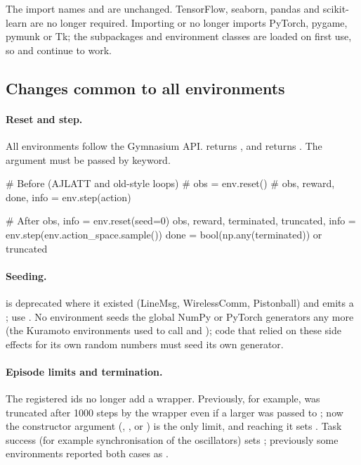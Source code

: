 The import names  and  are unchanged. TensorFlow,
seaborn, pandas and scikit-learn are no longer required. Importing
 or  no longer imports PyTorch, pygame, pymunk or
Tk; the subpackages and environment classes are loaded on first use, so
 and
 continue to work.

\subsection{Changes common to all environments}\label{sec:migration-common}

\paragraph{Reset and step.}
All environments follow the Gymnasium API.  returns , and
 returns . The  argument must be passed by keyword.

\begin{pycode}
# Before (AJLATT and old-style loops)
# obs = env.reset()
# obs, reward, done, info = env.step(action)

# After
obs, info = env.reset(seed=0)
obs, reward, terminated, truncated, info = env.step(env.action_space.sample())
done = bool(np.any(terminated)) or truncated
\end{pycode}

\paragraph{Seeding.}
 is deprecated where it existed (LineMsg, WirelessComm,
Pistonball) and emits a ; use
. No environment seeds the global NumPy or PyTorch
generators any more (the Kuramoto environments used to call
 and ); code that relied
on these side effects for its own random numbers must seed its own generator.

\paragraph{Episode limits and termination.}
The registered ids no longer add a  wrapper. Previously, for
example,  was truncated after 1000 steps by the
wrapper even if a larger  was passed to ; now
the constructor argument (, ,
 or ) is the only limit, and
reaching it sets . Task success (for example
synchronisation of the oscillators) sets ; previously
some environments reported both cases as .

